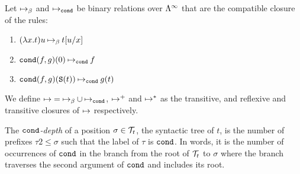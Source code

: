 \begin{definition}\label{def:reduction}
Let $\mathbin{\mapsto}_\beta$ and $\mathbin{\mapsto}_{\tt cond}$ be binary relations over $\Lambda^\infty$ that are the compatible closure of the rules:

\begin{enumerate}
\item $(\lambda x.t)u \mathbin{\mapsto}_\beta t[u/x]$
\item ${\tt cond}(f,g)(0) \mathbin{\mapsto}_{\tt cond} f$
\item ${\tt cond}(f,g)({\tt S} (t)) \mathbin{\mapsto}_{\tt cond} g(t)$
\end{enumerate}
We define $\mathbin{\mapsto} = \mathbin{\mapsto}_\beta \cup \mathbin{\mapsto}_{\tt cond}$, $\mathbin{\mapsto}^+$ and $\mathbin{\mapsto}^*$ as the transitive, and reflexive and transitive
closures of $\mathbin{\mapsto}$ respectively.
\end{definition}

The {\em ${\tt cond}$-depth} of a position $\sigma \in {\cal T}_t$, the syntactic tree of $t$, is the number of prefixes $\tau 2 \leq \sigma$ such that
the label of $\tau$ is ${\tt cond}$. In words, it is the number of occurrences of ${\tt cond}$ in the branch from the root of ${\cal T}_t$ to $\sigma$
where the branch traverses the second argument of ${\tt cond}$ and includes its root.


